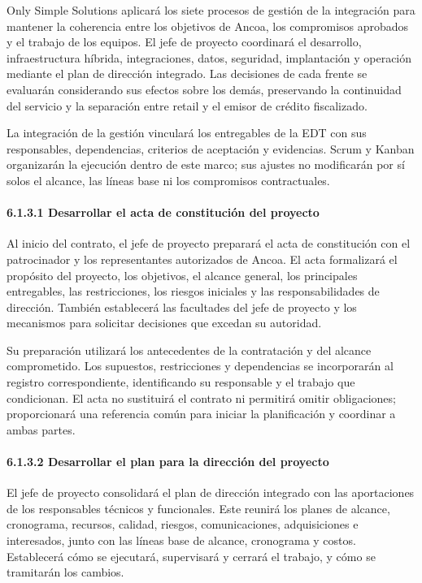\documentclass[11pt]{article}
\begin{document}
Only Simple Solutions aplicará los siete procesos de gestión de la integración para mantener la coherencia entre los objetivos de Ancoa, los compromisos aprobados y el trabajo de los equipos. El jefe de proyecto coordinará el desarrollo, infraestructura híbrida, integraciones, datos, seguridad, implantación y operación mediante el plan de dirección integrado. Las decisiones de cada frente se evaluarán considerando sus efectos sobre los demás, preservando la continuidad del servicio y la separación entre retail y el emisor de crédito fiscalizado.

La integración de la gestión vinculará los entregables de la EDT con sus
responsables, dependencias, criterios de aceptación y evidencias. Scrum
y Kanban organizarán la ejecución dentro de este marco; sus ajustes no
modificarán por sí solos el alcance, las líneas base ni los compromisos
contractuales.

\paragraph{6.1.3.1 Desarrollar el acta de constitución del proyecto}\label{6-1-3-1-desarrollar-el-acta-de-constitucion-del-proyecto}

Al inicio del contrato, el jefe de proyecto preparará el acta de constitución con el patrocinador y los representantes autorizados de Ancoa. El acta formalizará el propósito del proyecto, los objetivos, el alcance general, los principales entregables, las restricciones, los riesgos iniciales y las responsabilidades de dirección. También establecerá las facultades del jefe de proyecto y los mecanismos para solicitar decisiones que excedan su autoridad.

Su preparación utilizará los antecedentes de la contratación y del
alcance comprometido. Los supuestos, restricciones y dependencias se
incorporarán al registro correspondiente, identificando su responsable y
el trabajo que condicionan. El acta no sustituirá el contrato ni
permitirá omitir obligaciones; proporcionará una referencia común para
iniciar la planificación y coordinar a ambas partes.

\paragraph{6.1.3.2 Desarrollar el plan para la dirección del proyecto}\label{6-1-3-2-desarrollar-el-plan-para-la-direccion-del-proyecto}

El jefe de proyecto consolidará el plan de dirección integrado con las aportaciones de los responsables técnicos y funcionales. Este reunirá los planes de alcance, cronograma, recursos, calidad, riesgos, comunicaciones, adquisiciones e interesados, junto con las líneas base de alcance, cronograma y costos. Establecerá cómo se ejecutará, supervisará y cerrará el trabajo, y cómo se tramitarán los cambios.
\end{document}
